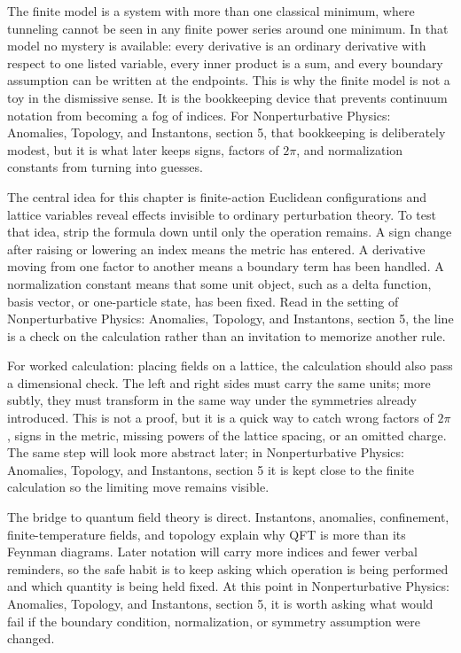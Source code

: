 The finite model is a system with more than one classical minimum, where tunneling cannot be seen in any finite power series around one minimum.  In that model no mystery is available: every derivative is an ordinary derivative with respect to one listed variable, every inner product is a sum, and every boundary assumption can be written at the endpoints.  This is why the finite model is not a toy in the dismissive sense.  It is the bookkeeping device that prevents continuum notation from becoming a fog of indices.  For Nonperturbative Physics: Anomalies, Topology, and Instantons, section 5, that bookkeeping is deliberately modest, but it is what later keeps signs, factors of \(2\pi\), and normalization constants from turning into guesses.

The central idea for this chapter is finite-action Euclidean configurations and lattice variables reveal effects invisible to ordinary perturbation theory.  To test that idea, strip the formula down until only the operation remains.  A sign change after raising or lowering an index means the metric has entered.  A derivative moving from one factor to another means a boundary term has been handled.  A normalization constant means that some unit object, such as a delta function, basis vector, or one-particle state, has been fixed.  Read in the setting of Nonperturbative Physics: Anomalies, Topology, and Instantons, section 5, the line is a check on the calculation rather than an invitation to memorize another rule.

For worked calculation: placing fields on a lattice, the calculation should also pass a dimensional check.  The left and right sides must carry the same units; more subtly, they must transform in the same way under the symmetries already introduced.  This is not a proof, but it is a quick way to catch wrong factors of \(2\pi\), signs in the metric, missing powers of the lattice spacing, or an omitted charge.  The same step will look more abstract later; in Nonperturbative Physics: Anomalies, Topology, and Instantons, section 5 it is kept close to the finite calculation so the limiting move remains visible.

The bridge to quantum field theory is direct.  Instantons, anomalies, confinement, finite-temperature fields, and topology explain why QFT is more than its Feynman diagrams.  Later notation will carry more indices and fewer verbal reminders, so the safe habit is to keep asking which operation is being performed and which quantity is being held fixed.  At this point in Nonperturbative Physics: Anomalies, Topology, and Instantons, section 5, it is worth asking what would fail if the boundary condition, normalization, or symmetry assumption were changed.

